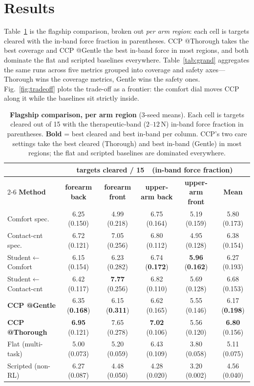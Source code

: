 \documentclass[conference]{IEEEtran}
\newcommand{\best}[1]{\textbf{#1}}
\begin{document}
\section{Results}
\label{sec:results}
Table~\ref{tab:main} is the flagship comparison, broken out \emph{per arm region}: each cell is
targets cleared with the in-band force fraction in parentheses. CCP @Thorough takes the best
coverage and CCP @Gentle the best in-band force in most regions, and both dominate the flat and
scripted baselines everywhere. Table~\ref{tab:grand} aggregates the same runs across five
metrics grouped into coverage and safety axes---Thorough wins the coverage metrics, Gentle wins
the safety ones. Fig.~\ref{fig:tradeoff} plots the trade-off as a frontier: the comfort dial
moves CCP along it while the baselines sit strictly inside.

\begin{table}[t]
\centering\small
\caption{\textbf{Flagship comparison, per arm region} (3-seed means). Each cell is targets
cleared out of 15 with the therapeutic-band ($2$--$12$\,N) in-band force fraction in
parentheses. \best{Bold} = best cleared and best in-band per column. CCP's two care settings
take the best cleared (Thorough) and best in-band (Gentle) in most regions; the flat and
scripted baselines are dominated everywhere.}
\label{tab:main}
\setlength{\tabcolsep}{5pt}
\begin{tabular}{l ccccc}
\toprule
 & \multicolumn{5}{c}{\textbf{targets cleared / 15\ \ (in-band force fraction)}}\\
\cmidrule(l){2-6}
\textbf{Method} & \textbf{forearm back} & \textbf{forearm front} & \textbf{upper-arm back} & \textbf{upper-arm front} & \textbf{Mean}\\
\midrule
Comfort spec.                  & 6.25 (0.150) & 4.99 (0.218) & 6.75 (0.164) & 5.19 (0.159) & 5.80 (0.173)\\
Contact-cnt spec.              & 6.72 (0.121) & 7.05 (0.256) & 6.80 (0.112) & 4.95 (0.128) & 6.38 (0.154)\\
Student$\leftarrow$Comfort     & 6.15 (0.154) & 6.23 (0.282) & 6.74 (\best{0.172}) & \best{5.96} (\best{0.162}) & 6.27 (0.193)\\
Student$\leftarrow$Contact-cnt & 6.42 (0.117) & \best{7.77} (0.256) & 6.82 (0.110) & 5.69 (0.128) & 6.68 (0.153)\\
\textbf{CCP @Gentle}           & 6.35 (\best{0.168}) & 6.15 (\best{0.311}) & 6.62 (0.165) & 5.55 (0.146) & 6.17 (\best{0.198})\\
\textbf{CCP @Thorough}         & \best{6.95} (0.121) & 7.65 (0.278) & \best{7.02} (0.106) & 5.56 (0.120) & \best{6.80} (0.156)\\
\midrule
Flat (multi-task)              & 5.00 (0.073) & 5.20 (0.059) & 6.43 (0.109) & 3.80 (0.058) & 5.11 (0.075)\\
Scripted (non-RL)              & 6.27 (0.087) & 4.48 (0.050) & 4.28 (0.020) & 3.20 (0.002) & 4.56 (0.040)\\
\bottomrule
\end{tabular}
\end{table}
\end{document}
